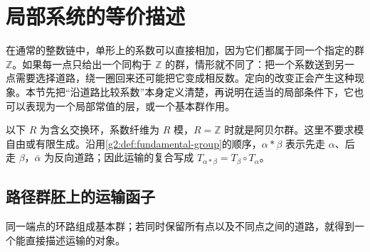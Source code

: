 
% 
% 

\section{局部系统的等价描述}
\label{g2:sec:0501}

在通常的整数链中，单形上的系数可以直接相加，因为它们都属于同一个指定的群 \(\mathbb Z\)。如果每一点只给出一个同构于 \(\mathbb Z\) 的群，情形就不同了：把一个系数送到另一点需要选择道路，绕一圈回来还可能把它变成相反数。定向的改变正会产生这种现象。本节先把“沿道路比较系数”本身定义清楚，再说明在适当的局部条件下，它也可以表现为一个局部常值的层，或一个基本群作用。

\ProseParagraphBreak

以下 \(R\) 为含幺交换环，系数纤维为 \(R\) 模，\(R=\mathbb Z\) 时就是阿贝尔群。这里不要求模自由或有限生成。沿用\cref{g2:def:fundamental-group}的顺序，\(\alpha*\beta\) 表示先走 \(\alpha\)、后走 \(\beta\)，\(\bar\alpha\) 为反向道路；因此运输的复合写成 \(T_{\alpha*\beta}=T_\beta\circ T_\alpha\)。

\subsection{路径群胚上的运输函子}
\label{g2:subsec:0501:01}
同一端点的环路组成基本群；若同时保留所有点以及不同点之间的道路，就得到一个能直接描述运输的对象。


